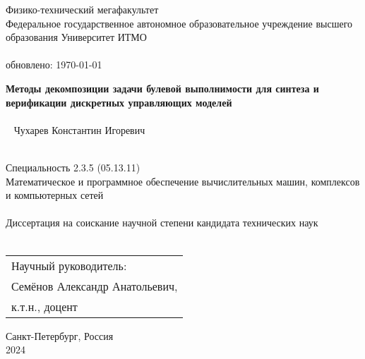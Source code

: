 \thispagestyle{empty}


\vspace{0pt plus2fill} %
\begin{center}
	Физико-технический мегафакультет \\
	Федеральное государственное автономное образовательное учреждение высшего образования Университет ИТМО \\ \ \\
	{\tiny обновлено: \today}
\end{center}

\vspace*{230pt}
\begin{center}
\textbf {\large %
Методы декомпозиции задачи булевой выполнимости для синтеза и верификации дискретных управляющих моделей
} \\ \ \\ \
{\large
Чухарев Константин Игоревич
}
\\ \

Специальность 2.3.5 (05.13.11) \\
Математическое и программное обеспечение вычислительных машин, комплексов и компьютерных сетей \\ \ \\
Диссертация на соискание научной степени кандидата технических наук \\ \ \\
\hfill\begin{tabular}{l}
Научный руководитель: \\
Семёнов Александр Анатольевич, \\
к.т.н., доцент
\end{tabular}
\end{center}

\vspace{0pt plus2fill} %

\begin{center}
	Санкт-Петербург, Россия\\
	2024
\end{center}
